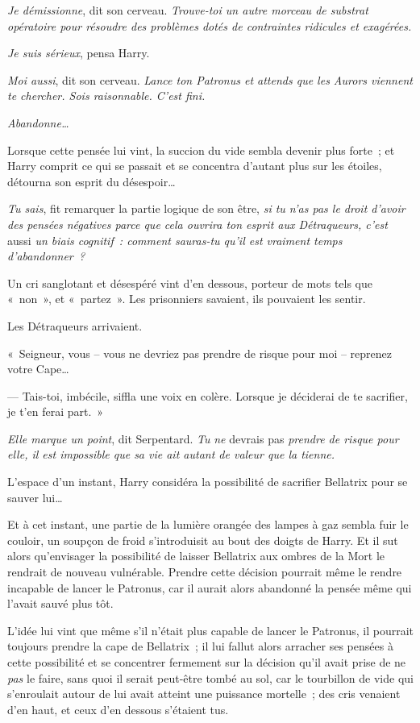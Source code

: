 \emph{Je démissionne}, dit son cerveau. \emph{Trouve-toi un autre morceau de substrat opératoire pour résoudre des problèmes dotés de contraintes ridicules et exagérées.}

\emph{Je suis sérieux}, pensa Harry.

\emph{Moi aussi}, dit son cerveau. \emph{Lance ton Patronus et attends que les Aurors viennent te chercher. Sois raisonnable. C'est fini.}

\emph{Abandonne…}

Lorsque cette pensée lui vint, la succion du vide sembla devenir plus forte~; et Harry comprit ce qui se passait et se concentra d'autant plus sur les étoiles, détourna son esprit du désespoir…

\emph{Tu sais}, fit remarquer la partie logique de son être, \emph{si tu n'as pas le droit d'avoir des pensées négatives parce que cela ouvrira ton esprit aux Détraqueurs, c'est} aussi \emph{un biais cognitif~: comment sauras-tu qu'il est vraiment temps d'abandonner~?}

Un cri sanglotant et désespéré vint d'en dessous, porteur de mots tels que «~non~», et «~partez~». Les prisonniers savaient, ils pouvaient les sentir.

Les Détraqueurs arrivaient.

«~Seigneur, vous -- vous ne devriez pas prendre de risque pour moi -- reprenez votre Cape…

--- Tais-toi, imbécile, siffla une voix en colère. Lorsque je déciderai de te sacrifier, je t'en ferai part.~»

\emph{Elle marque un point}, dit Serpentard. \emph{Tu} \emph{ne} devrais pas \emph{prendre de risque pour elle, il est impossible que sa vie ait autant de valeur que la tienne.}

L'espace d'un instant, Harry considéra la possibilité de sacrifier Bellatrix pour se sauver lui…

Et à cet instant, une partie de la lumière orangée des lampes à gaz sembla fuir le couloir, un soupçon de froid s'introduisit au bout des doigts de Harry. Et il sut alors qu'envisager la possibilité de laisser Bellatrix aux ombres de la Mort le rendrait de nouveau vulnérable. Prendre cette décision pourrait même le rendre incapable de lancer le Patronus, car il aurait alors abandonné la pensée même qui l'avait sauvé plus tôt.

L'idée lui vint que même s'il n'était plus capable de lancer le Patronus, il pourrait toujours prendre la cape de Bellatrix~; il lui fallut alors arracher ses pensées à cette possibilité et se concentrer fermement sur la décision qu'il avait prise de ne \emph{pas} le faire, sans quoi il serait peut-être tombé au sol, car le tourbillon de vide qui s'enroulait autour de lui avait atteint une puissance mortelle~; des cris venaient d'en haut, et ceux d'en dessous s'étaient tus.

